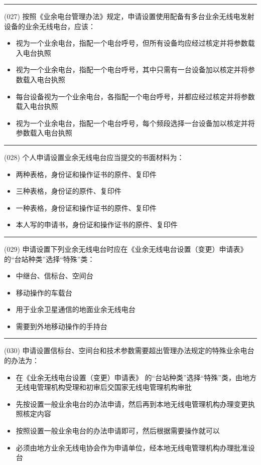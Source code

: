 \documentclass[twocolumn]{ctexart}  %
\begin{document}
\noindent\rule{0.5\textwidth}{1pt}
\heiti (027) 按照《业余电台管理办法》规定，申请设置使用配备有多台业余无线电发射设备的业余无线电台，应该： \songti {\color{gray} [LK0010] }
\begin{itemize}
	\item  视为一个业余电台，指配一个电台呼号，但所有设备均应经过核定并将参数载入电台执照
	\item  视为一个业余电台，指配一个电台呼号，其中只需有一台设备加以核定并将参数载入电台执照
	\item  每台设备视为一个业余电台，各指配一个电台呼号，并都应经过核定并将参数载入电台执照
	\item  视为一个业余电台，指配一个电台呼号，每个频段选择一台设备加以核定并将参数载入电台执照
\end{itemize}


\noindent\rule{0.5\textwidth}{1pt}
\heiti (028) 个人申请设置业余无线电台应当提交的书面材料为： \songti {\color{gray} [LK0023] }
\begin{itemize}
	\item  两种表格，身份证和操作证书的原件、复印件
	\item  三种表格，身份证的原件、复印件
	\item  一种表格，身份证和操作证书的原件、复印件
	\item  本人写的申请书，身份证和操作证书的原件、复印件
\end{itemize}


\noindent\rule{0.5\textwidth}{1pt}
\heiti (029) 申请设置下列业余无线电台时应在《业余无线电台设置（变更）申请表》 的“台站种类”选择“特殊”类： \songti {\color{gray} [LK0028] }
\begin{itemize}
	\item  中继台、信标台、空间台
	\item  移动操作的车载台
	\item  用于业余卫星通信的地面业余无线电台
	\item  需要到外地移动操作的手持台
\end{itemize}


\noindent\rule{0.5\textwidth}{1pt}
\heiti (030) 申请设置信标台、空间台和技术参数需要超出管理办法规定的特殊业余电台的办法为： \songti {\color{gray} [LK0029] }
\begin{itemize}
	\item  在《业余无线电台设置（变更）申请表》 的“台站种类”选择“特殊”类，由地方无线电管理机构受理和初审后交国家无线电管理机构审批
	\item  先按设置一般业余电台的办法申请，然后再到本地无线电管理机构办理变更执照核定内容
	\item  按照设置一般业余电台的办法申请即可，然后根据需要操作就可以
	\item  必须由地方业余无线电协会作为申请单位，经本地无线电管理机构办理批准设台
\end{itemize}
\end{document}
